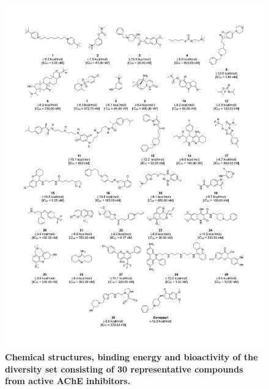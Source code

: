 \documentclass[fleqn,10pt]{wlpeerj}
\begin{document}
\begin{figure}[!t]
\centering
\includegraphics[width = \linewidth]{Fig_Chemical_Structure}
\caption{\textbf{Chemical structures, binding energy and bioactivity of the diversity set consisting of 30 representative compounds from active AChE inhibitors.}} 
\label{fig:chemical_structure}
\end{figure}
\end{document}

